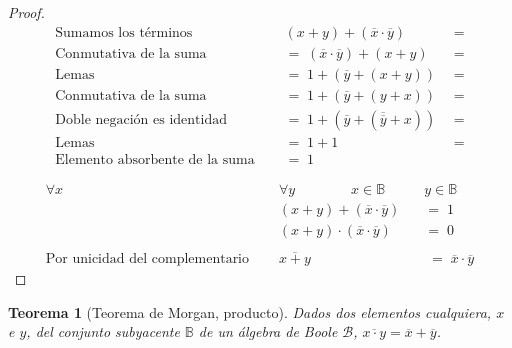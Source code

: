 \documentclass[final,12pt,a4paper,twoside,fleqn]{extbook}
\newcommand{\setB}{\ensuremath{\mathbb{B}}}
\newtheorem{thm}{Teorema}[chapter]
\theoremstyle{definition}
\theoremstyle{remark}
\begin{document}
\begin{proof}
\begin{align}
\text{Sumamos los términos }\quad& \left( { x + y } \right) + \left( \overline{x} \cdot \overline{y} \right) \quad&=\\
\text{Conmutativa de la suma }\quad&=\; \left( \overline{x} \cdot \overline{y} \right) + \left( { x + y } \right) \quad&=\\
\text{Lemas }\quad&=\; 1 + \left( \overline{y} + \left( x + y \right) \right) \;&=\\
\text{Conmutativa de la suma }\quad&=\; 1 + \left( \overline{y} + \left( y + x \right) \right) \;&=\\
\text{Doble negación es identidad }\quad&=\; 1 + \left( \overline{y} + \left( \overline{\overline{y}} + x \right) \right) \;&=\\
\text{Lemas }\quad&=\; 1 + 1 \;&=\\
\text{Elemento absorbente de la suma }\quad&=\; 1
\end{align}



\begin{align}
\forall x \qquad& \forall y \qquad \qquad x \in \setB \qquad& y \in \setB\\
{} & \left( x + y \right) + \left( \overline{x}\cdot \overline{y} \right) \;&=\; 1\\
{} & \left( x + y \right) \cdot \left( \overline{x}\cdot \overline{y} \right) \;&=\; 0\\
\\ \nonumber
\text{Por unicidad del complementario }\quad&\overline{ {x + y} } &\;=\;\overline{x}\cdot\overline{y}
\end{align}




\end{proof}






\begin{thm}[Teorema de Morgan, producto]
Dados dos elementos cualquiera, \(x \) e \(y\), del conjunto subyacente \(\setB\) de un álgebra de Boole \(\mathscr{B}\), \( \overline{x \cdot y} = \overline{x} + \overline{y} \).
\end{thm}
\end{document}
